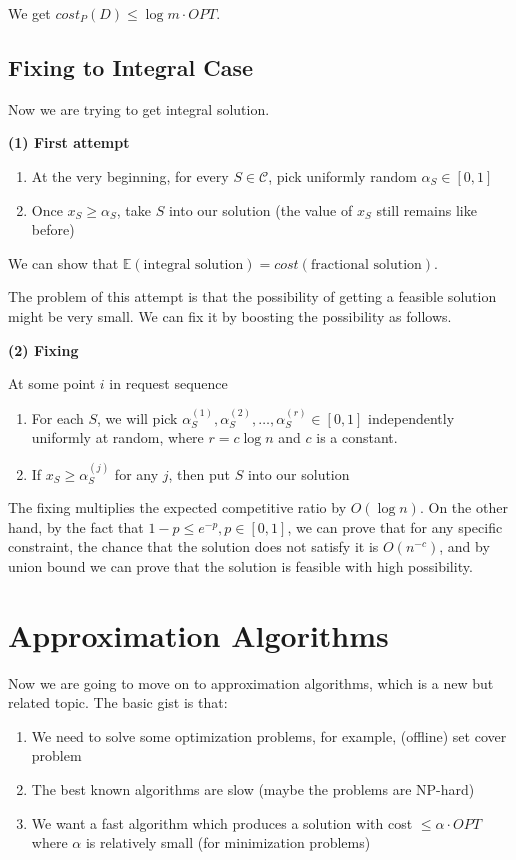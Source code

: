 \documentclass[11pt]{article}
\begin{document}
We get $cost_P(D)\le \log m \cdot OPT$.

\subsection{Fixing to Integral Case}
Now we are trying to get integral solution. 

\textbf{(1) First attempt} 
\begin{enumerate}
\item At the very beginning, for every $S\in \mathcal{C}$, pick uniformly random $\alpha_S\in [0,1]$

\item Once $x_S\ge \alpha_S$, take $S$ into our solution (the value of $x_S$ still remains like before)
\end{enumerate}

We can show that $\mathbb{E}(\text{integral solution}) = cost(\text{fractional solution})$.

The problem of this attempt is that the possibility of getting a feasible solution might be very small. We can fix it by boosting the possibility as follows.

\textbf{(2) Fixing}

At some point $i$ in request sequence
\begin{enumerate}
\item For each $S$, we will pick $\alpha_S^{(1)}, \alpha_S^{(2)}, \ldots, \alpha_S^{(r)}\in [0,1]$ independently uniformly at random, where $r=c \log n$ and $c$ is a constant. 
\item If $x_S\ge \alpha_S^{(j)}$ for any $j$, then put $S$ into our solution
\end{enumerate}

The fixing multiplies the expected competitive ratio by $O(\log n)$. On the other hand, by the fact that $1-p\le e^{-p}, p\in [0,1]$, we can prove that for any specific constraint, the chance that the solution does not satisfy it is $O(n^{-c})$, and by union bound we can prove that the solution is feasible with high possibility. 

\section{Approximation Algorithms} \label{section:approximation_algorithms}

Now we are going to move on to approximation algorithms, which is a new but related topic. The basic gist is that:
\begin{enumerate}
\item We need to solve some optimization problems, for example, (offline) set cover problem
\item The best known algorithms are slow (maybe the problems are NP-hard)
\item We want a fast algorithm which produces a solution with cost $\le \alpha \cdot OPT$ where $\alpha$ is relatively small (for minimization problems)
\end{enumerate}
\end{document}
